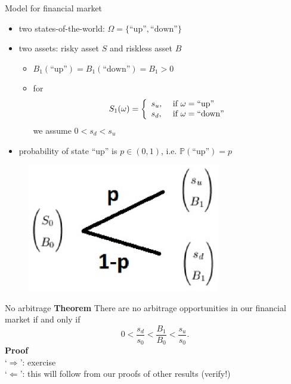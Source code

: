 \documentclass[pdf, handout]{beamer}
\begin{document}
\begin{frame}{Model for financial market}
\begin{itemize}
\item two states-of-the-world: $\Omega=\{ \text{``up''},\text{``down''}\}$
\item two assets: risky asset $S$ and riskless asset $B$
\begin{itemize}
\item $B_1(\text{``up''})=B_1(\text{``down''})=B_1>0$
\item for
\[
S_1(\omega)=\left\{
              \begin{array}{ll}
                s_u, & \hbox{ if } \omega=\text{``up''} \\
                s_d, & \hbox{ if }\omega=\text{``down''}
              \end{array}
            \right.
\]
we assume 
$0<s_d<s_u$
\end{itemize}
\item  probability of state ``up'' is $p\in(0,1)$, i.e. $\mathbb{P}(\text{``up''})=p$
\end{itemize}
\begin{figure}
\includegraphics[width=0.75\textwidth]{1period-1.eps}
\end{figure}
\end{frame}

\begin{frame}{No arbitrage}
\textbf{Theorem} 
There are no arbitrage opportunities in our financial market if and only if 
\[
0<\frac{s_d}{s_0}<\frac{B_1}{B_0}<\frac{s_u}{s_0}.
\]
\textbf{Proof} \\
`$\Rightarrow$':  exercise \\
 `$\Leftarrow$':  this will follow from our proofs of other results (verify!)
\end{frame}
\end{document}
